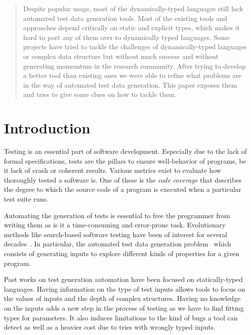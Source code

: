 \documentclass{llncs2e/llncs}
\begin{document}
\vfill

\begin{abstract}
Despite popular usage, most of the dynamically-typed languages still lack
automated test data generation tools. Most of the existing tools and approaches
depend critically on static and explicit types, which makes it hard to port any
of them over to dynamically typed languages. Some projects have tried to tackle
the challenges of dynamically-typed languages or complex data structure but
without much success and without generating momemtum in the research community.
After trying to develop a better tool than existing ones we were able to refine
what problems are in the way of automated test data generation. This paper
exposes them and tries to give some clues on how to tackle them.
\end{abstract}
%
\newpage


\section{Introduction}
Testing is an essential part of software development. Especially due to the lack
of formal specifications, tests are the pillars to ensure well-behavior of
programs, be it lack of crash or coherent results. Various metrics exist to
evaluate how thoroughly tested a software is. One of these is the \textit{code
coverage} that describes the degree to which the source code of a program is
executed when a particular test suite runs.

Automating the generation of tests is essential to free the programmer from
writing them as is it a time-consuming and error-prone task. Evolutionary
methods like search-based software testing have been of interest for several
decades~\cite{miller1976automatic}. In particular, the automated test data
generation problem~\cite{korel1990automated} which consists of generating inputs
to explore different kinds of properties for a given program.

Past works on test generation automation have been focused on statically-typed
languages. Having information on the type of test inputs allows tools to focus
on the values of inputs and the depth of complex structures. Having no knowledge
on the inputs adds a new step in the process of testing as we have to find
fitting types for parameters. It also induces limitations to the kind of bugs a
tool can detect as well as a heavier cost due to tries with wrongly typed
inputs.
\end{document}
